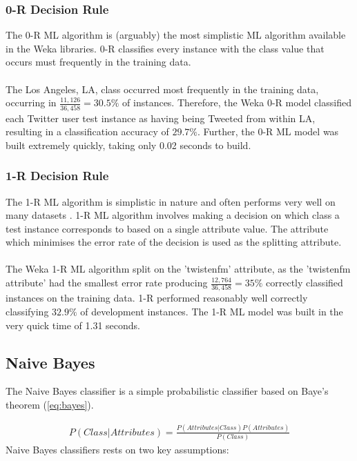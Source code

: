 \documentclass[11pt]{article}
\begin{document}
\subsubsection{0-R Decision Rule}

The 0-R ML algorithm is (arguably) the most simplistic ML algorithm available in the Weka libraries. 0-R classifies every instance with the class value that occurs must frequently in the training data.\\\\
The Los Angeles, LA, class occurred most frequently in the training data, occurring in $\frac{11,126}{36,458} = 30.5\%$ of instances. Therefore, the Weka 0-R model classified each Twitter user test instance as having being Tweeted from within LA, resulting in a classification accuracy of $29.7\%$. Further, the 0-R ML model was built extremely quickly, taking only 0.02 seconds to build.    

\subsubsection{1-R Decision Rule}

The 1-R ML algorithm is simplistic in nature and often performs very well on many datasets \cite{holte-1R}. 1-R ML algorithm involves making a decision on which class a test instance corresponds to based on a single attribute value. The attribute which minimises the error rate of the decision is used as the splitting attribute.\\\\
The Weka 1-R ML algorithm split on the 'twistenfm' attribute, as the 'twistenfm attribute' had the smallest error rate producing $\frac{12,764}{36,458} = 35\%$ correctly classified instances on the training data. 1-R performed reasonably well correctly classifying $32.9\%$ of development instances. The 1-R ML model was built in the very quick time of 1.31 seconds. 

\subsection{Naive Bayes}

The Naive Bayes classifier is a simple probabilistic classifier based on Baye's theorem (\ref{eq:bayes}). 

\begin{gather*}
P(Class|Attributes) = \frac{P(Attributes|Class)P(Attributes)}{P(Class)} \tag{1}\label{eq:bayes}
\end{gather*}
Naive Bayes classifiers rests on two key assumptions:
\end{document}
